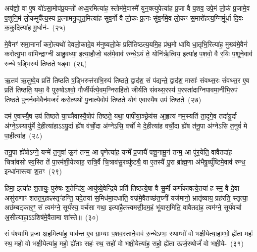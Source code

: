 {\anuvakamend[{भू॒या॒स्त॒ स्व॒स्तये\-ऽग्ने॑ पुष्यासं धृ॒षद्व॑र्ण॒मेका॒न्न\-त्रि॒ꣳ॒शच्च॑}]}

अय॑ज्ञो॒ वा ए॒ष यो॑\-ऽसा॒मोप॑प्र॒यन्तो॑ अध्व॒रमित्या॑ह॒ स्तोम॑मे॒वास्मै॑ युन॒क्त्युपेत्या॑ह प्र॒जा वै प॒शव॒ उपे॒मं लो॒कं प्र॒जामे॒व प॒शूनि॒मं लो॒कमुपै᳚त्य॒स्य प्र॒त्नामनु॒द्युत॒मित्या॑ह सुव॒र्गो वै लो॒कः प्र॒त्नः सु॑व॒र्गमे॒व लो॒कꣳ स॒मारो॑हत्य॒ग्निर्मू॒र्धा दि॒वः क॒कुदित्या॑ह मू॒र्धान॑-~(२५)\ip

मे॒वैनꣳ॑ समा॒नानां᳚ करो॒त्यथो॑ देवलो॒कादे॒व म॑नुष्यलो॒के प्रति॑तिष्ठत्य॒यमि॒ह प्र॑थ॒मो धा॑यि धा॒तृभि॒रित्या॑ह॒ मुख्य॑मे॒वैनं॑ करोत्यु॒भा वा॑मिन्द्राग्नी आहु॒वध्या॒ इत्या॒हौजो॒ बल॑मे॒वाव॑ रुन्धे॒\-ऽयं ते॒ योनि॑र्\mbox{}ऋ॒त्विय॒ इत्या॑ह प॒शवो॒ वै र॒यिः प॒शूने॒वाव॑ रुन्धे ष॒ड्भिरुप॑ तिष्ठते॒ षड्वा~(२६)\ip

ऋ॒तव॑ ऋ॒तुष्वे॒व प्रति॑ तिष्ठति ष॒ड्भिरुत्त॑राभि॒रुप॑ तिष्ठते॒ द्वाद॑श॒ सं प॑द्यन्ते॒ द्वाद॑श॒ मासाः᳚ संवथ्स॒रः सं॑वथ्स॒र ए॒व प्रति॑ तिष्ठति॒ यथा॒ वै पुरु॒षो\-ऽश्वो॒ गौर्जीर्य॑त्ये॒वम॒ग्निराहि॑तो जीर्यति संवथ्स॒रस्य॑ प॒रस्ता॑दाग्निपावमा॒नीभि॒रुप॑ तिष्ठते पुनर्न॒वमे॒वैन॑म॒जरं॑ करो॒त्यथो॑ पु॒नात्ये॒वोप॑ तिष्ठते॒ योग॑ ए॒वास्यै॒ष उप॑ तिष्ठते॒~(२७)\ip

दम॑ ए॒वास्यै॒ष उप॑ तिष्ठते या॒च्ञैवास्यै॒षोप॑ तिष्ठते॒ यथा॒ पापी॑या॒ञ्छ्रेय॑स आ॒हृत्य॑ नम॒स्यति॑ ता॒दृगे॒व तदा॑यु॒र्दा अ॑ग्ने॒\-ऽस्यायु॑र्मे दे॒हीत्या॑हा\-ऽऽ\-यु॒र्दा ह्ये॑ष व॑र्चो॒दा अ॑ग्ने\-ऽसि॒ वर्चो॑ मे दे॒हीत्या॑ह वर्चो॒दा ह्ये॑ष त॑नू॒पा अ॑ग्ने\-ऽसि त॒नुवं॑ मे पा॒हीत्या॑ह~(२८)\ip

तनू॒पा ह्ये॑षो\-ऽग्ने॒ यन्मे॑ त॒नुवा॑ ऊ॒नं तन्म॒ आ पृ॒णेत्या॑ह॒ यन्मे᳚ प्र॒जायै॑ पशू॒नामू॒नं तन्म॒ आ पू॑र॒येति॒ वावैतदा॑ह॒ चित्रा॑वसो स्व॒स्ति ते॑ पा॒रम॑शी॒येत्या॑ह॒ रात्रि॒र्वै चि॒त्राव॑सु॒रव्यु॑ष्ट्यै॒ वा ए॒तस्यै॑ पु॒रा ब्रा᳚ह्म॒णा अ॑भैषु॒र्व्यु॑ष्टिमे॒वाव॑ रुन्ध॒ इन्धा॑नास्त्वा श॒तꣳ~(२९)\ip

हिमा॒ इत्या॑ह श॒तायुः॒ पुरु॑षः श॒तेन्द्रि॑य॒ आयु॑ष्ये॒वेन्द्रि॒ये प्रति॑ तिष्ठत्ये॒षा वै सू॒र्मी कर्ण॑कावत्ये॒तया॑ ह स्म॒ वै दे॒वा असु॑राणाꣳ शतत॒र्॒\mbox{}हाꣴ\-स्तृꣳ॑हन्ति॒ यदे॒तया॑ स॒मिध॑मा॒दधा॑ति॒ वज्र॑मे॒वैतच्छ॑त॒घ्नीं यज॑मानो॒ भ्रातृ॑व्याय॒ प्रह॑रति॒ स्तृत्या॒ अछ॑म्बट्कार॒ꣳ॒ सं त्वम॑ग्ने॒ सूर्य॑स्य॒ वर्च॑सा गथा॒ इत्या॑है॒तत्त्वमसी॒दम॒हं भू॑यास॒मिति॒ वावैतदा॑ह॒ त्वम॑ग्ने॒ सूर्य॑वर्चा अ॒सीत्या॑हा॒\-ऽऽ\-शिष॑मे॒वैतामा शा᳚स्ते॥~(३०)\ip

{\anuvakamend[{मू॒र्धानं॒ वै तिष्ठ॑त आह श॒तम॒हꣳ षोड॑श च}]}

सं प॑श्यामि प्र॒जा अ॒हमित्या॑ह॒ याव॑न्त ए॒व ग्रा॒म्याः प॒शव॒स्ताने॒वाव॑ रु॒न्धे\-ऽम्भः॒ स्थाम्भो॑ वो भक्षी॒येत्या॒हाम्भो॒ ह्ये॑ता महः॑ स्थ॒ महो॑ वो भक्षी॒येत्या॑ह॒ महो॒ ह्ये॑ताः सहः॑ स्थ॒ सहो॑ वो भक्षी॒येत्या॑ह॒ सहो॒ ह्ये॑ता ऊर्ज॒स्थोर्जं॑ वो भक्षी॒ये-~(३१)\ip

